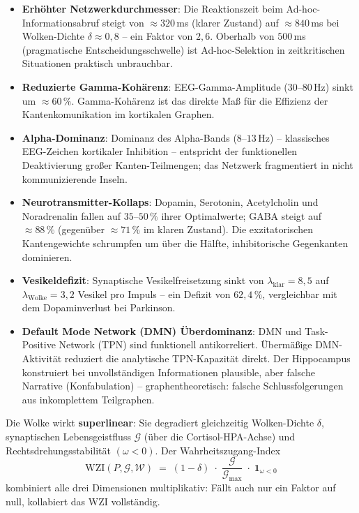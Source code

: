 ﻿\documentclass[a4paper,12pt]{article}
\theoremstyle{definition}
\begin{document}
	\begin{itemize}
		\item[-] \textbf{Erhöhter Netzwerkdurchmesser}: Die Reaktionszeit beim Ad-hoc-Informationsab\-ruf steigt von $\approx 320$\,ms (klarer Zustand) auf $\approx 840$\,ms bei Wolken-Dichte $\delta \approx 0{,}8$ -- ein Faktor von $2{,}6$. Oberhalb von $500$\,ms (pragmatische Entscheidungsschwelle) ist Ad-hoc-Selektion in zeitkritischen Situationen praktisch unbrauchbar.
		\item[-] \textbf{Reduzierte Gamma-Kohärenz}: EEG-Gamma-Amplitude ($30$--$80$\,Hz) sinkt um $\approx 60\,\%$. Gamma-Kohärenz ist das direkte Maß für die Effizienz der Kantenkomunikation im kortikalen Graphen.
		\item[-] \textbf{Alpha-Dominanz}: Dominanz des Alpha-Bands ($8$--$13$\,Hz) -- klassisches EEG-Zeichen kortikaler Inhibition -- entspricht der funktionellen Deaktivierung großer Kanten-Teilmengen; das Netzwerk fragmentiert in nicht kommunizierende Inseln.
		\item[-] \textbf{Neurotransmitter-Kollaps}: Dopamin, Serotonin, Acetylcholin und Noradrenalin fallen auf $35$--$50\,\%$ ihrer Optimalwerte; GABA steigt auf $\approx 88\,\%$ (gegenüber $\approx 71\,\%$ im klaren Zustand). Die exzitatorischen Kantengewichte schrumpfen um über die Hälfte, inhibitorische Gegenkanten dominieren.
		\item[-] \textbf{Vesikeldefizit}: Synaptische Vesikelfreisetzung sinkt von $\lambda_{\text{klar}} = 8{,}5$ auf $\lambda_{\text{Wolke}} = 3{,}2$ Vesikel pro Impuls -- ein Defizit von $62{,}4\,\%$, vergleichbar mit dem Dopaminverlust bei Parkinson.
		\item[-] \textbf{Default Mode Network (DMN) Überdominanz}: DMN und Task-Positive Network (TPN) sind funktionell antikorreliert. Übermäßige DMN-Aktivität reduziert die analytische TPN-Kapazität direkt. Der Hippocampus konstruiert bei unvollständigen Informationen plausible, aber falsche Narrative (Konfabulation) -- graphentheoretisch: falsche Schlussfolgerungen aus inkomplettem Teilgraphen.
	\end{itemize}

	Die Wolke wirkt \textbf{superlinear}: Sie degradiert gleichzeitig Wolken-Dichte $\delta$, synaptischen Lebensgeistfluss $\mathcal{G}$ (über die Cortisol-HPA-Achse) und Rechtsdrehungsstabilität $(\omega < 0)$. Der Wahrheitszugang-Index
	\[
	\mathrm{WZI}(P,\mathcal{G},\mathcal{W}) \;=\; (1-\delta) \;\cdot\; \frac{\mathcal{G}}{\mathcal{G}_{\max}} \;\cdot\; \mathbf{1}_{\omega < 0}
	\]
	kombiniert alle drei Dimensionen multiplikativ: Fällt auch nur ein Faktor auf null, kollabiert das $\mathrm{WZI}$ vollständig.
\end{document}
